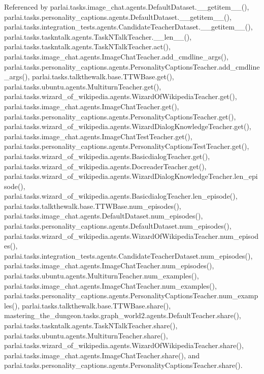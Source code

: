 Referenced by parlai.\+tasks.\+image\+\_\+chat.\+agents.\+Default\+Dataset.\+\_\+\+\_\+getitem\+\_\+\+\_\+(), parlai.\+tasks.\+personality\+\_\+captions.\+agents.\+Default\+Dataset.\+\_\+\+\_\+getitem\+\_\+\+\_\+(), parlai.\+tasks.\+integration\+\_\+tests.\+agents.\+Candidate\+Teacher\+Dataset.\+\_\+\+\_\+getitem\+\_\+\+\_\+(), parlai.\+tasks.\+taskntalk.\+agents.\+Task\+N\+Talk\+Teacher.\+\_\+\+\_\+len\+\_\+\+\_\+(), parlai.\+tasks.\+taskntalk.\+agents.\+Task\+N\+Talk\+Teacher.\+act(), parlai.\+tasks.\+image\+\_\+chat.\+agents.\+Image\+Chat\+Teacher.\+add\+\_\+cmdline\+\_\+args(), parlai.\+tasks.\+personality\+\_\+captions.\+agents.\+Personality\+Captions\+Teacher.\+add\+\_\+cmdline\+\_\+args(), parlai.\+tasks.\+talkthewalk.\+base.\+T\+T\+W\+Base.\+get(), parlai.\+tasks.\+ubuntu.\+agents.\+Multiturn\+Teacher.\+get(), parlai.\+tasks.\+wizard\+\_\+of\+\_\+wikipedia.\+agents.\+Wizard\+Of\+Wikipedia\+Teacher.\+get(), parlai.\+tasks.\+image\+\_\+chat.\+agents.\+Image\+Chat\+Teacher.\+get(), parlai.\+tasks.\+personality\+\_\+captions.\+agents.\+Personality\+Captions\+Teacher.\+get(), parlai.\+tasks.\+wizard\+\_\+of\+\_\+wikipedia.\+agents.\+Wizard\+Dialog\+Knowledge\+Teacher.\+get(), parlai.\+tasks.\+image\+\_\+chat.\+agents.\+Image\+Chat\+Test\+Teacher.\+get(), parlai.\+tasks.\+personality\+\_\+captions.\+agents.\+Personality\+Captions\+Test\+Teacher.\+get(), parlai.\+tasks.\+wizard\+\_\+of\+\_\+wikipedia.\+agents.\+Basicdialog\+Teacher.\+get(), parlai.\+tasks.\+wizard\+\_\+of\+\_\+wikipedia.\+agents.\+Docreader\+Teacher.\+get(), parlai.\+tasks.\+wizard\+\_\+of\+\_\+wikipedia.\+agents.\+Wizard\+Dialog\+Knowledge\+Teacher.\+len\+\_\+episode(), parlai.\+tasks.\+wizard\+\_\+of\+\_\+wikipedia.\+agents.\+Basicdialog\+Teacher.\+len\+\_\+episode(), parlai.\+tasks.\+talkthewalk.\+base.\+T\+T\+W\+Base.\+num\+\_\+episodes(), parlai.\+tasks.\+image\+\_\+chat.\+agents.\+Default\+Dataset.\+num\+\_\+episodes(), parlai.\+tasks.\+personality\+\_\+captions.\+agents.\+Default\+Dataset.\+num\+\_\+episodes(), parlai.\+tasks.\+wizard\+\_\+of\+\_\+wikipedia.\+agents.\+Wizard\+Of\+Wikipedia\+Teacher.\+num\+\_\+episodes(), parlai.\+tasks.\+integration\+\_\+tests.\+agents.\+Candidate\+Teacher\+Dataset.\+num\+\_\+episodes(), parlai.\+tasks.\+image\+\_\+chat.\+agents.\+Image\+Chat\+Teacher.\+num\+\_\+episodes(), parlai.\+tasks.\+ubuntu.\+agents.\+Multiturn\+Teacher.\+num\+\_\+examples(), parlai.\+tasks.\+image\+\_\+chat.\+agents.\+Image\+Chat\+Teacher.\+num\+\_\+examples(), parlai.\+tasks.\+personality\+\_\+captions.\+agents.\+Personality\+Captions\+Teacher.\+num\+\_\+examples(), parlai.\+tasks.\+talkthewalk.\+base.\+T\+T\+W\+Base.\+share(), mastering\+\_\+the\+\_\+dungeon.\+tasks.\+graph\+\_\+world2.\+agents.\+Default\+Teacher.\+share(), parlai.\+tasks.\+taskntalk.\+agents.\+Task\+N\+Talk\+Teacher.\+share(), parlai.\+tasks.\+ubuntu.\+agents.\+Multiturn\+Teacher.\+share(), parlai.\+tasks.\+wizard\+\_\+of\+\_\+wikipedia.\+agents.\+Wizard\+Of\+Wikipedia\+Teacher.\+share(), parlai.\+tasks.\+image\+\_\+chat.\+agents.\+Image\+Chat\+Teacher.\+share(), and parlai.\+tasks.\+personality\+\_\+captions.\+agents.\+Personality\+Captions\+Teacher.\+share().

